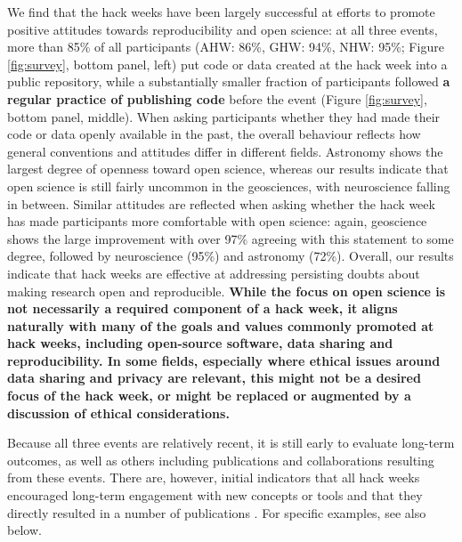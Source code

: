 We find that the hack weeks have been largely successful at efforts to promote positive attitudes towards reproducibility and open science: at all three events, more than 85\% of all participants (AHW: 86\%, GHW: 94\%, NHW: 95\%; Figure \ref{fig:survey}, bottom panel, left) put code or data created at the hack week into a public repository, while a substantially smaller fraction of participants followed \textbf{a regular practice of publishing code} before the event (Figure \ref{fig:survey}, bottom panel, middle).
When asking participants whether they had made their code or data openly available in the past, the overall behaviour reflects how general conventions and attitudes differ in different fields.
Astronomy shows the largest degree of openness toward open science, whereas our results indicate that open science is still fairly uncommon in the geosciences, with neuroscience falling in between.
Similar attitudes are reflected when asking whether the hack week has made participants more comfortable with open science: again, geoscience shows the large improvement with over 97\% agreeing with this statement to some degree, followed by neuroscience (95\%) and astronomy (72\%).
Overall, our results indicate that hack weeks are effective at addressing persisting doubts about making research open and reproducible. \textbf{While the focus on open science is not necessarily a required component of a hack week, it aligns naturally with many of the goals and values commonly promoted at hack weeks, including open-source software, data sharing and reproducibility. In some fields, especially where ethical issues around data sharing and privacy are relevant, this might not be a desired focus of the hack week, or might be replaced or augmented by a discussion of ethical considerations.}

Because all three events are relatively recent, it is still early to evaluate long-term outcomes, as well as others including publications and collaborations resulting from these events.
There are, however, initial indicators that all hack weeks encouraged long-term engagement with new concepts or tools and that they directly resulted in a number of publications \cite{gullysantiago2015,faria2016,keshavan2017,leonard2017,jordan2017,peterson2017,hahn2017,pricewhelan2017}. For specific examples, see also below.

